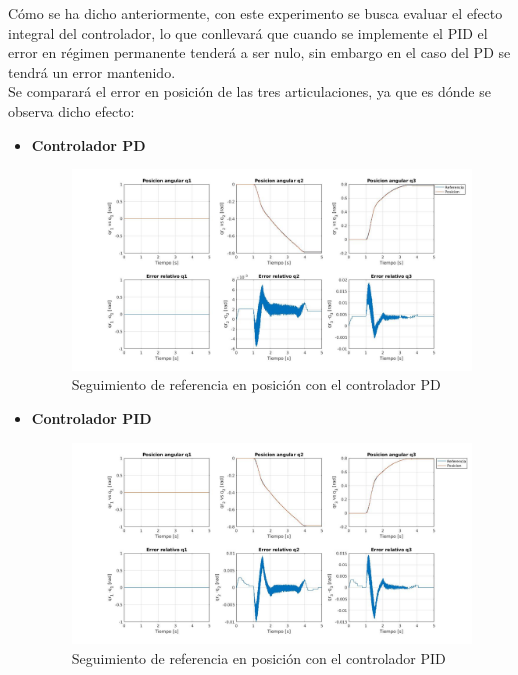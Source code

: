 Cómo se ha dicho anteriormente, con este experimento se busca evaluar el efecto integral del controlador, lo que conllevará que cuando se implemente el PID el error en régimen permanente tenderá a ser nulo, sin embargo en el caso del PD se tendrá un error mantenido.\\
Se comparará el error en posición de las tres articulaciones, ya que es dónde se observa dicho efecto:

\begin{itemize}
	\item \textbf{Controlador PD}



	\begin{figure}[h!]

		\centering

		\includegraphics[width=.8\textwidth]{exp1_posPD}

		\caption{Seguimiento de referencia en posición con el controlador PD}

	\end{figure}




	\item \textbf{Controlador PID}

	\begin{figure}[h!]

		\centering

		\includegraphics[width=.8\textwidth]{exp1_posPID}

		\caption{Seguimiento de referencia en posición con el controlador PID}

	\end{figure}



\end{itemize}



